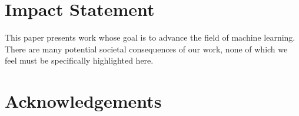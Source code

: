 \documentclass{article}
\theoremstyle{plain}
\theoremstyle{definition}
\theoremstyle{remark}
\begin{document}
\printAffiliationsAndNotice{\icmlEqualContribution}

\begin{abstract}
  We study how we can leverage only a handful of characteristics of a transformer's architecture to closely predict the number of different sequences it can output, both qualitatively and quantitatively.
  We provide an upper bound depending on the length of the prompt, which we show empirically to be tight up to a factor less than 10, across architectures and model sizes.
  Our analysis also provides a theoretical explanation for previously observed empirical failures of transformers on simple sequence tasks---such as copying and cramming.
  Formally, we prove that (i) the maximal length of accessible sequences (those that the transformer can output for some prompt) grows linearly with the prompt length, (ii) beyond a critical threshold, the proportion of accessible sequences decays exponentially with sequence length, and (iii) the linear coefficient relating prompt length to accessible sequence length admits a theoretical upper bound.
  Notably, these results hold even with unbounded context and computation time.
\end{abstract}













\newpage

\section*{Impact Statement}

This paper presents work whose goal is to advance the field of machine learning. There are many potential societal consequences of our work, none of which we feel must be specifically highlighted here.

\section*{Acknowledgements}
\end{document}

